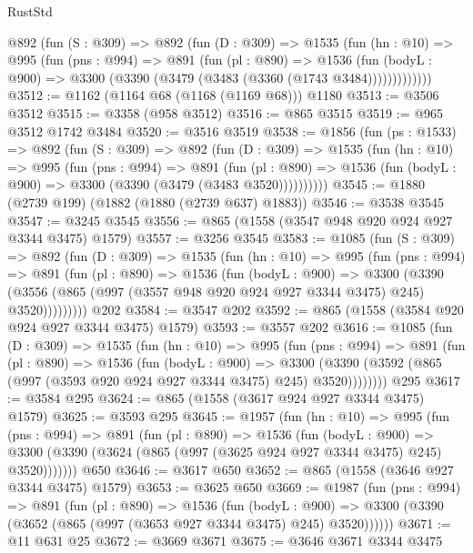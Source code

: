 \begin{lexlean}{RustStd}
\begin{coremodule}
      @892
        (fun (S : @309) =>
        @892
          (fun (D : @309) =>
          @1535
            (fun (hn : @10) =>
            @995
              (fun (pns : @994) =>
              @891
                (fun (pl : @890) =>
                @1536
                  (fun (bodyL : @900) => @3300 (@3390 (@3479 (@3483 (@3360 (@1743 @3484)))))))))))))
@3512 := @1162 (@1164 @68 (@1168 (@1169 @68))) @1180
@3513 := @3506 @3512
@3515 := @3358 (@958 @3512)
@3516 := @865 @3515
@3519 := @965 @3512 @1742 @3484
@3520 := @3516 @3519
@3538 := @1856
    (fun (ps : @1533) =>
    @892
      (fun (S : @309) =>
      @892
        (fun (D : @309) =>
        @1535
          (fun (hn : @10) =>
          @995
            (fun (pns : @994) =>
            @891
              (fun (pl : @890) =>
              @1536 (fun (bodyL : @900) => @3300 (@3390 (@3479 (@3483 @3520))))))))))
@3545 := @1880 (@2739 @199) (@1882 (@1880 (@2739 @637) @1883))
@3546 := @3538 @3545
@3547 := @3245 @3545
@3556 := @865 (@1558 (@3547 @948 @920 @924 @927 @3344 @3475) @1579)
@3557 := @3256 @3545
@3583 := @1085
    (fun (S : @309) =>
    @892
      (fun (D : @309) =>
      @1535
        (fun (hn : @10) =>
        @995
          (fun (pns : @994) =>
          @891
            (fun (pl : @890) =>
            @1536
              (fun (bodyL : @900) =>
              @3300
                (@3390
                  (@3556 (@865 (@997 (@3557 @948 @920 @924 @927 @3344 @3475) @245) @3520)))))))))
    @202
@3584 := @3547 @202
@3592 := @865 (@1558 (@3584 @920 @924 @927 @3344 @3475) @1579)
@3593 := @3557 @202
@3616 := @1085
    (fun (D : @309) =>
    @1535
      (fun (hn : @10) =>
      @995
        (fun (pns : @994) =>
        @891
          (fun (pl : @890) =>
          @1536
            (fun (bodyL : @900) =>
            @3300 (@3390 (@3592 (@865 (@997 (@3593 @920 @924 @927 @3344 @3475) @245) @3520))))))))
    @295
@3617 := @3584 @295
@3624 := @865 (@1558 (@3617 @924 @927 @3344 @3475) @1579)
@3625 := @3593 @295
@3645 := @1957
    (fun (hn : @10) =>
    @995
      (fun (pns : @994) =>
      @891
        (fun (pl : @890) =>
        @1536
          (fun (bodyL : @900) =>
          @3300 (@3390 (@3624 (@865 (@997 (@3625 @924 @927 @3344 @3475) @245) @3520)))))))
    @650
@3646 := @3617 @650
@3652 := @865 (@1558 (@3646 @927 @3344 @3475) @1579)
@3653 := @3625 @650
@3669 := @1987
    (fun (pns : @994) =>
    @891
      (fun (pl : @890) =>
      @1536
        (fun (bodyL : @900) =>
        @3300 (@3390 (@3652 (@865 (@997 (@3653 @927 @3344 @3475) @245) @3520))))))
@3671 := @11 @631 @25
@3672 := @3669 @3671
@3675 := @3646 @3671 @3344 @3475

\end{coremodule}
\end{lexlean}
